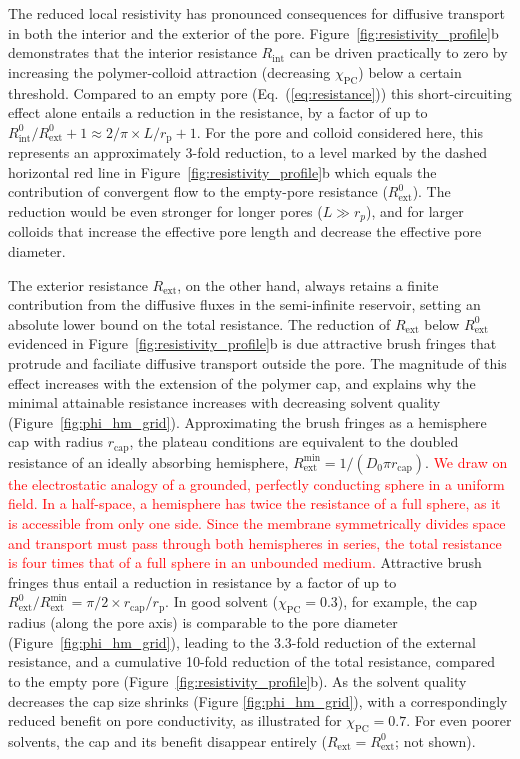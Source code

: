 \documentclass[12pt, a4paper]{article}
\newcommand\todo[1]{\textcolor{red}{#1}}
\begin{document}
The reduced local resistivity has pronounced consequences for diffusive transport in both the interior and the exterior of the pore.
Figure~\ref{fig:resistivity_profile}b demonstrates that the interior resistance $R_{\text{int}}$ can be driven practically to zero by increasing the polymer-colloid attraction (decreasing $\chi_\text{PC}$) below a certain threshold.
Compared to an empty pore (Eq.~(\ref{eq:resistance})) this short-circuiting effect alone entails a reduction in the resistance, by a factor of up to $R^0_{\text{int}}/R^0_{\text{ext}}+1 \approx 2/\pi \times L / r_{\text{p}} + 1$.
For the pore and colloid considered here, this represents an approximately 3-fold reduction, to a level marked by the dashed horizontal red line in Figure~\ref{fig:resistivity_profile}b which equals the contribution of convergent flow to the empty-pore resistance ($R^0_\text{ext}$).
The reduction would be even stronger for longer pores ($L\gg r_p$), and for larger colloids that increase the effective pore length and decrease the effective pore diameter.

The exterior resistance $R_{\text{ext}}$, on the other hand, always retains a finite contribution from the diffusive fluxes in the semi-infinite reservoir, setting an absolute lower bound on the total resistance.
The reduction of $R_{\text{ext}}$ below $R^0_\text{ext}$ evidenced in Figure~\ref{fig:resistivity_profile}b is due attractive brush fringes that protrude and faciliate diffusive transport outside the pore.
The magnitude of this effect increases with the extension of the polymer cap, and explains why the minimal attainable resistance increases with decreasing solvent quality (Figure~\ref{fig:phi_hm_grid}).
Approximating the brush fringes as a hemisphere cap with radius $r_\text{cap}$, the plateau conditions are equivalent to the doubled resistance of an ideally absorbing hemisphere, $R_\text{ext}^\text{min} = 1 / (D_0 \pi r_\text{cap})$.
\todo{We draw on the electrostatic analogy of a grounded, perfectly conducting sphere in a uniform field.
In a half-space, a hemisphere has twice the resistance of a full sphere, as it is accessible from only one side.
Since the membrane symmetrically divides space and transport must pass through both hemispheres in series, the total resistance is four times that of a full sphere in an unbounded medium.}
Attractive brush fringes thus entail a reduction in resistance by a factor of up to $R_\text{ext}^0 / R_\text{ext}^\text{min} = \pi/2 \times r_\text{cap}/r_\text{p}$.
In good solvent ($\chi_\text{PC} = 0.3$), for example, the cap radius (along the pore axis) is comparable to the pore diameter (Figure~\ref{fig:phi_hm_grid}), leading to the 3.3-fold reduction of the external resistance, and a cumulative 10-fold reduction of the total resistance, compared to the empty pore (Figure~\ref{fig:resistivity_profile}b).
As the solvent quality decreases the cap size shrinks (Figure \ref{fig:phi_hm_grid}), with a correspondingly reduced benefit on pore conductivity, as illustrated for $\chi_\text{PC} = 0.7$.
For even poorer solvents, the cap and its benefit disappear entirely ($R_\text{ext} = R_\text{ext}^0$; not shown).
\end{document}

